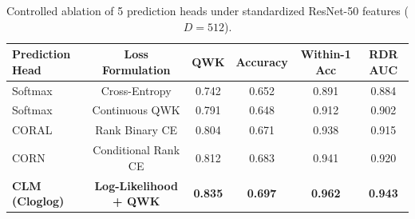 \begin{table}[htbp]
\centering
\caption{Controlled ablation of 5 prediction heads under standardized ResNet-50 features ($D=512$).}
\label{tab:head_ablation}
\small
\begin{tabular}{lccccc}
\toprule
\textbf{Prediction Head} & \textbf{Loss Formulation} & \textbf{QWK} & \textbf{Accuracy} & \textbf{Within-1 Acc} & \textbf{RDR AUC} \\
\midrule
Softmax & Cross-Entropy & 0.742 & 0.652 & 0.891 & 0.884 \\
Softmax & Continuous QWK & 0.791 & 0.648 & 0.912 & 0.902 \\
CORAL & Rank Binary CE & 0.804 & 0.671 & 0.938 & 0.915 \\
CORN & Conditional Rank CE & 0.812 & 0.683 & 0.941 & 0.920 \\
\textbf{CLM (Cloglog)} & \textbf{Log-Likelihood + QWK} & \textbf{0.835} & \textbf{0.697} & \textbf{0.962} & \textbf{0.943} \\
\bottomrule
\end{tabular}
\end{table}
